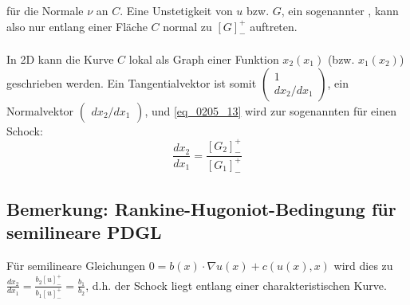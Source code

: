 	für die Normale $\nu$ an $C$. Eine Unstetigkeit von $u$ bzw. $G$, ein sogenannter , kann also nur entlang einer Fläche $C$ normal zu $[G]_-^+$ auftreten. \\
	\mbox{} \\
	In 2D kann die Kurve $C$ lokal als Graph einer Funktion $x_2(x_1)$ (bzw. $x_1(x_2)$) geschrieben werden. Ein Tangentialvektor ist somit $\begin{pmatrix} 1 \\ dx_2/dx_1 \end{pmatrix}$, ein Normalvektor $\begin{pmatrix} dx_2/dx_1	\end{pmatrix}$, und \eqref{eq_0205_13} wird zur sogenannten   für einen Schock: 
	\begin{equation}
		\frac{dx_2}{dx_1} = \frac{[G_2]_-^+}{[G_1]_-^+} \label{eq_0205_14}
	\end{equation}
	
\subsection{Bemerkung: Rankine-Hugoniot-Bedingung für semilineare PDGL}
\label{bem_17}
	Für semilineare Gleichungen \marginnote{[17]} $0 = b(x) \cdot \nabla u(x) + c(u(x),x)$ wird dies zu $\frac{dx_2}{dx_1} = \frac{b_2[u]_-^+}{b_1[u]_-^+} = \frac{b_1}{b_2}$, d.h. der Schock liegt entlang einer charakteristischen Kurve.
	
